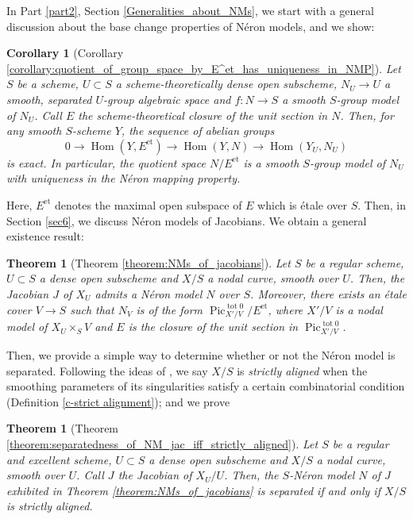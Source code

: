 \documentclass[a4paper,12pt]{amsart} %
\numberwithin{equation}{subsection}
\newcommand{\on}[1]{\operatorname{#1}}
\newcommand{\Hom}{\operatorname{Hom}}
\theoremstyle{definition}
\theoremstyle{plain}%
\newtheorem{theorem}[definition]{Theorem}
\newtheorem{corollary}[definition]{Corollary}
\theoremstyle{remark}
\begin{document}
In Part \ref{part2}, Section \ref{Generalities_about_NMs}, we start with a general discussion about the base change properties of Néron models, and we show:

\begin{corollary}[Corollary \ref{corollary:quotient_of_group_space_by_E^et_has_uniqueness_in_NMP}]
Let $S$ be a scheme, $U\subset S$ a scheme-theoretically dense open subscheme, $N_U \to U$ a smooth, separated $U$-group algebraic space and $f\colon N \to S$ a smooth $S$-group model of $N_U$. Call $E$ the scheme-theoretical closure of the unit section in $N$. Then, for any smooth $S$-scheme $Y$, the sequence of abelian groups
\[
0 \to \Hom(Y,E^{\on{et}}) \to \Hom(Y,N) \to \Hom(Y_U,N_U)
\]
is exact. In particular, the quotient space $N/E^{\on{et}}$ is a smooth $S$-group model of $N_U$ with uniqueness in the Néron mapping property.
\end{corollary}

Here, $E^{\on{et}}$ denotes the maximal open subspace of $E$ which is étale over $S$. Then, in Section \ref{sec6}, we discuss Néron models of Jacobians. We obtain a general existence result:

\begin{theorem}[Theorem \ref{theorem:NMs_of_jacobians}]
Let $S$ be a regular scheme, $U\subset S$ a dense open subscheme and $X/S$ a nodal curve, smooth over $U$. Then, the Jacobian $J$ of $X_U$ admits a Néron model $N$ over $S$. Moreover, there exists an étale cover $V \to S$ such that $N_V$ is of the form $\operatorname{Pic}^{\on{tot}0}_{X'/V}/E^{\on{et}}$, where $X'/V$ is a nodal model of $X_U\times_S V$ and $E$ is the closure of the unit section in $\operatorname{Pic}^{\on{tot}0}_{X'/V}$.
\end{theorem}

Then, we provide a simple way to determine whether or not the Néron model is separated. Following the ideas of \cite{Holmes}, we say $X/S$ is \emph{strictly aligned} when the smoothing parameters of its singularities satisfy a certain combinatorial condition (Definition \ref{c-strict alignment}); and we prove

\begin{theorem}[Theorem \ref{theorem:separatedness_of_NM_jac_iff_strictly_aligned}]
Let $S$ be a regular and excellent scheme, $U\subset S$ a dense open subscheme and $X/S$ a nodal curve, smooth over $U$. Call $J$ the Jacobian of $X_U/U$. Then, the $S$-Néron model $N$ of $J$ exhibited in Theorem \ref{theorem:NMs_of_jacobians} is separated if and only if $X/S$ is strictly aligned.
\end{theorem}
\end{document}
